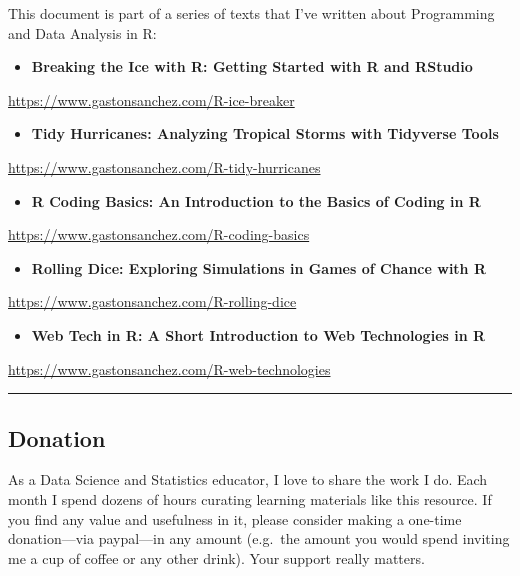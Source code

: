 \documentclass[
]{book}
\providecommand{\tightlist}{%
  \setlength{\itemsep}{0pt}\setlength{\parskip}{0pt}}
\begin{document}
This document is part of a series of texts that I've written about Programming
and Data Analysis in R:

\begin{itemize}
\tightlist
\item
  \textbf{Breaking the Ice with R: Getting Started with R and RStudio}
\end{itemize}

\url{https://www.gastonsanchez.com/R-ice-breaker}

\begin{itemize}
\tightlist
\item
  \textbf{Tidy Hurricanes: Analyzing Tropical Storms with Tidyverse Tools}
\end{itemize}

\url{https://www.gastonsanchez.com/R-tidy-hurricanes}

\begin{itemize}
\tightlist
\item
  \textbf{R Coding Basics: An Introduction to the Basics of Coding in R}
\end{itemize}

\url{https://www.gastonsanchez.com/R-coding-basics}

\begin{itemize}
\tightlist
\item
  \textbf{Rolling Dice: Exploring Simulations in Games of Chance with R}
\end{itemize}

\url{https://www.gastonsanchez.com/R-rolling-dice}

\begin{itemize}
\tightlist
\item
  \textbf{Web Tech in R: A Short Introduction to Web Technologies in R}
\end{itemize}

\url{https://www.gastonsanchez.com/R-web-technologies}

\begin{center}\rule{0.5\linewidth}{0.5pt}\end{center}

\hypertarget{donation}{%
\subsection*{Donation}\label{donation}}

As a Data Science and Statistics educator, I love to share the work I do.
Each month I spend dozens of hours curating learning materials like this resource.
If you find any value and usefulness in it, please consider making
a one-time donation---via paypal---in any amount (e.g.~the amount you would spend inviting me a cup of coffee or any other drink). Your support really matters.
\end{document}
